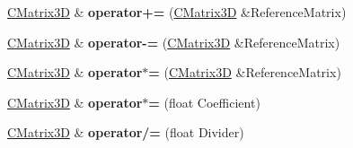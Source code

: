 \begin{DoxyCompactItemize}
\item 
\hyperlink{struct_c_matrix3_d}{C\+Matrix3D} \& {\bfseries operator+=} (\hyperlink{struct_c_matrix3_d}{C\+Matrix3D} \&Reference\+Matrix)\hypertarget{struct_c_matrix3_d_abcd57fa1403859ab42f9529b07725d70}{}\label{struct_c_matrix3_d_abcd57fa1403859ab42f9529b07725d70}

\item 
\hyperlink{struct_c_matrix3_d}{C\+Matrix3D} \& {\bfseries operator-\/=} (\hyperlink{struct_c_matrix3_d}{C\+Matrix3D} \&Reference\+Matrix)\hypertarget{struct_c_matrix3_d_a28f6f2589d276a857b4a3b65369c9449}{}\label{struct_c_matrix3_d_a28f6f2589d276a857b4a3b65369c9449}

\item 
\hyperlink{struct_c_matrix3_d}{C\+Matrix3D} \& {\bfseries operator$\ast$=} (\hyperlink{struct_c_matrix3_d}{C\+Matrix3D} \&Reference\+Matrix)\hypertarget{struct_c_matrix3_d_a9c194e210ce8821a3494946ed0bcf550}{}\label{struct_c_matrix3_d_a9c194e210ce8821a3494946ed0bcf550}

\item 
\hyperlink{struct_c_matrix3_d}{C\+Matrix3D} \& {\bfseries operator$\ast$=} (float Coefficient)\hypertarget{struct_c_matrix3_d_a4be77bf64567ae47906c052f6ec18683}{}\label{struct_c_matrix3_d_a4be77bf64567ae47906c052f6ec18683}

\item 
\hyperlink{struct_c_matrix3_d}{C\+Matrix3D} \& {\bfseries operator/=} (float Divider)\hypertarget{struct_c_matrix3_d_ab6a53825db21c5777032d4c7d3b3933b}{}\label{struct_c_matrix3_d_ab6a53825db21c5777032d4c7d3b3933b}


\end{DoxyCompactItemize}
